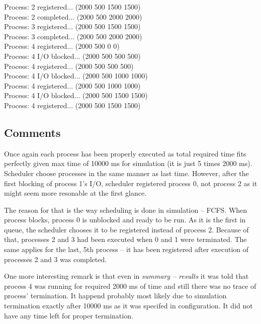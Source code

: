 \documentclass{article}
\begin{document}
Process: 2 registered... (2000 500 1500 1500)\\
Process: 2 completed... (2000 500 2000 2000)\\
Process: 3 registered... (2000 500 1500 1500)\\
Process: 3 completed... (2000 500 2000 2000)\\
Process: 4 registered... (2000 500 0 0)\\
Process: 4 I/O blocked... (2000 500 500 500)\\
Process: 4 registered... (2000 500 500 500)\\
Process: 4 I/O blocked... (2000 500 1000 1000)\\
Process: 4 registered... (2000 500 1000 1000)\\
Process: 4 I/O blocked... (2000 500 1500 1500)\\
Process: 4 registered... (2000 500 1500 1500)

\rmfamily

\subsection{Comments}
Once again each process has been properly executed as total required time fits perfectly
given max time of 10000 ms for simulation (it is just 5 times 2000 ms). Scheduler choose
processes in the same manner as last time. However, after the first blocking of process 1's
I/O, scheduler registered process 0, not process 2 as it might seem more resonable at the
first glance. 

The reason for that is the way scheduling is done in simulation -- FCFS.
When process blocks, process 0 is unblocked and ready to be run. As it is the first in queue,
the scheduler chooses it to be registered instead of process 2. Because of that,
processes 2 and 3 had been executed when 0 and 1 were terminated. The same applies for the last,
5th process -- it has been registered after execution of processes 2 and 3 was completed.

One more interesting remark is that even in \emph{summary -- results} it was told that
process 4 was running for required 2000 ms of time and still there was no trace of process'
termination. It happend probably most likely due to simulation termination exactly after 10000 ms
as it was specifed in configuration. It did not have any time left for proper termination.
\end{document}
